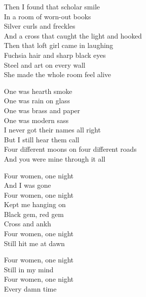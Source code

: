 \begin{lyrics}
Then I found that scholar smile\\
In a room of worn-out books\\
Silver curls and freckles\\
And a cross that caught the light and hooked\\
Then that loft girl came in laughing\\
Fuchsia hair and sharp black eyes\\
Steel and art on every wall\\
She made the whole room feel alive

One was hearth smoke\\
One was rain on glass\\
One was brass and paper\\
One was modern sass\\
I never got their names all right\\
But I still hear them call\\
Four different moons on four different roads\\
And you were mine through it all

Four women, one night\\
And I was gone\\
Four women, one night\\
Kept me hanging on\\
Black gem, red gem\\
Cross and ankh\\
Four women, one night\\
Still hit me at dawn

Four women, one night\\
Still in my mind\\
Four women, one night\\
Every damn time

\end{lyrics}

